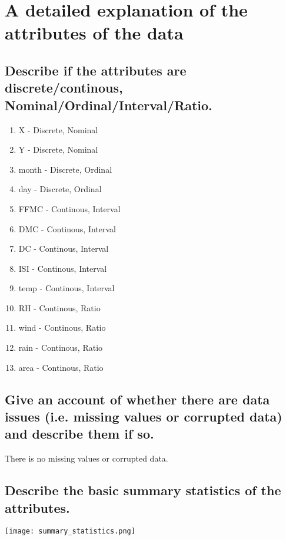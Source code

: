 \section{A detailed explanation of the attributes of the data}

\subsection*{Describe if the attributes are discrete/continous, Nominal/Ordinal/Interval/Ratio.}
	\begin{enumerate}
	\item X - Discrete, Nominal
	\item Y - Discrete, Nominal
	\item month - Discrete, Ordinal
	\item day - Discrete, Ordinal
	\item FFMC - Continous, Interval
	\item DMC - Continous, Interval
	\item DC - Continous, Interval
	\item ISI - Continous, Interval
	\item temp - Continous, Interval
	\item RH - Continous, Ratio
	\item wind - Continous, Ratio
	\item rain - Continous, Ratio
	\item area - Continous, Ratio
	\end{enumerate}
\subsection*{Give an account of whether there are data issues (i.e. missing values or corrupted data) and describe them if so.}
There is no missing values or corrupted data.
\subsection*{Describe the basic summary statistics of the attributes.}
\texttt{[image: summary\_statistics.png]}